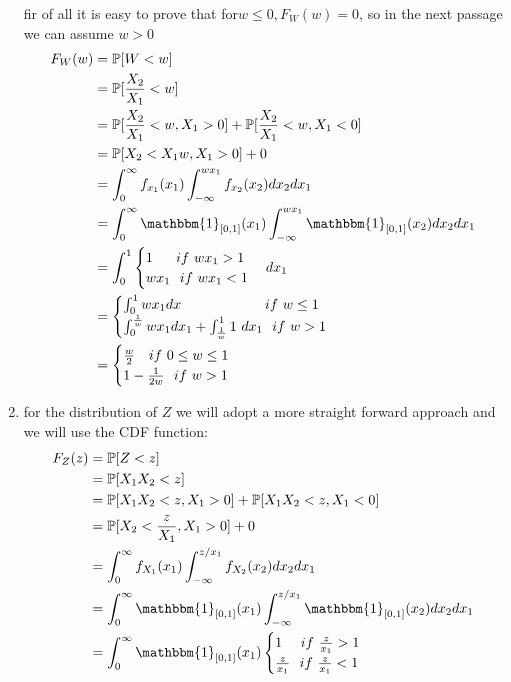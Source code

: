 \begin{ex}
\begin{enumerate}
		fir of all it is easy to prove that for$w\leq 0,F_W(w)=0$, so in the next passage we can assume $w>0$ 
		\[
		\begin{split}
		F_W(w)
		&=\p [W<w]\\
		&=\p[\frac{X_2}{X_1}<w]\\
		&=\p[\frac{X_2}{X_1}<w,X_1>0]+\p[\frac{X_2}{X_1}<w,X_1<0]\\
		&=\p[X_2<X_1w,X_1>0]+0\\
		&=\int_{0}^{\infty}f_{x_1}(x_1)\int_{-\infty}^{wx_1}f_{x_2}(x_2)dx_2dx_1\\
		&=\int_{0}^{\infty}\mathbbm{1}_{[0,1]}(x_1)\int_{-\infty}^{wx_1}\mathbbm{1}_{[0,1]}(x_2)dx_2dx_1\\
		&=\int_{0}^{1}	\begin{cases}
		1 \ \ \ \ \  if \ wx_1>1 \\
		wx_1 \ \  if \  wx_1<1
		\end{cases}dx_1\\
		&=\begin{cases}
		\int_0^1 wx_1 dx \ \ \ \ \ \ \ \ \ \ \ \ \ \ \ \ \ \ if \ w\leq 1\\
		\int_{0}^{\frac{1}{w}} wx_1dx_1+\int_{\frac{1}{w}}^{1} 1\ dx_1 \ \  if \ w>1
		\end{cases} \\
		&=\begin{cases}
		\frac{w}{2} \ \ \ if \ 0\leq w\leq 1\\
		1-\frac{1}{2w} \ \  if \ w>1
		\end{cases}
		\end{split}
		\]
		\item for the distribution of $Z$ we will adopt a more straight forward approach and we will use the CDF function:
		\[
		\begin{split}
		F_Z(z)
		&=\p [Z<z]\\
		&=\p[X_1X_2<z]\\
		&=\p[X_1X_2<z,X_1>0]+\p[X_1X_2<z,X_1<0]\\
		&=\p[X_2<\frac{z}{X_1},X_1>0]+0\\
		&=\int_{0}^{\infty}f_{X_1}(x_1)\int_{-\infty}^{z/x_1}f_{X_2}(x_2)dx_2 dx_1\\
		&=\int_{0}^{\infty}\mathbbm{1}_{[0,1]}(x_1)\int_{-\infty}^{z/x_1}\mathbbm{1}_{[0,1]}(x_2)dx_2 dx_1\\
		&=\int_{0}^{\infty} \mathbbm{1}_{[0,1]}(x_1)
		\begin{cases}
		1 \ \ \ \  if \ \frac{z}{x_1}>1 \\
		\frac{z}{x_1} \ \  if \  \frac{z}{x_1}<1

\end{cases}
\end{split}\]
\end{enumerate}
\end{ex}
